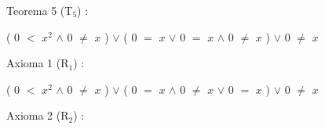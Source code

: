 \documentclass[12pt]{article}
\begin{document}
{\textcolor{carrotorange}{Teorema 5 (T$_{5}$) :}} \vspace{0.5cm}

(\hspace{0.2cm} $0$ $<$ $x^{2}$ \hspace{0.2cm} $\wedge$ \hspace{0.2cm} $0$ $\neq$ $x$ \hspace{0.2cm}) \hspace{0.2cm} $\vee$ \hspace{0.2cm} (\hspace{0.2cm} $0$ $=$ $x$ \hspace{0.2cm} $\vee$ \hspace{0.2cm} $0$ $=$ $x$ \hspace{0.2cm} $\wedge$ \hspace{0.2cm} $0$ $\neq$ $x$ \hspace{0.2cm}) \hspace{0.2cm} $\vee$ \hspace{0.2cm} $0$ $\neq$ $x$ \vspace{0.5cm}

{\textcolor{carrotorange}{Axioma 1 (R$_{1}$) :}} \vspace{0.5cm}

(\hspace{0.2cm} $0$ $<$ $x^{2}$ \hspace{0.2cm} $\wedge$ \hspace{0.2cm} $0$ $\neq$ $x$ \hspace{0.2cm}) \hspace{0.2cm} $\vee$ \hspace{0.2cm} (\hspace{0.2cm} $0$ $=$ $x$ \hspace{0.2cm} $\wedge$ \hspace{0.2cm} $0$ $\neq$ $x$ \hspace{0.2cm} $\vee$  \hspace{0.2cm} $0$ $=$ $x$ \hspace{0.2cm}) \hspace{0.2cm} $\vee$ \hspace{0.2cm} $0$ $\neq$ $x$ \vspace{0.5cm}


{\textcolor{carrotorange}{Axioma 2 (R$_{2}$) :}} \vspace{0.5cm}
\end{document}
